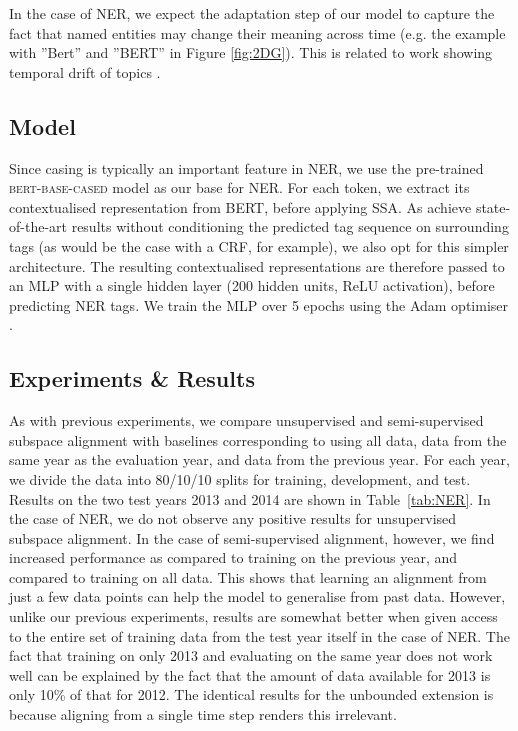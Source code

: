 \documentclass[letterpaper]{article} %
\begin{document}
In the case of NER, we expect the adaptation step of our model to capture the fact that named entities may change their meaning across time (e.g. the example with ''Bert'' and ''BERT'' in Figure \ref{fig:2DG}).
This is related to work showing temporal drift of topics \cite{wang2006topics}.

\subsection{Model}
Since casing is typically an important feature in NER, we use the pre-trained \textsc{bert-base-cased} model as our base for NER.
For each token, we extract its contextualised representation from BERT, before applying SSA.
As \citeauthor{bert} achieve state-of-the-art results without conditioning the predicted tag sequence on surrounding tags (as would be the case with a CRF, for example), we also opt for this simpler architecture.
The resulting contextualised representations are therefore passed to an MLP with a single hidden layer (200 hidden units, ReLU activation), before predicting NER tags.
We train the MLP over 5 epochs using the Adam optimiser \cite{adam}.


\subsection{Experiments \& Results}
As with previous experiments, we compare unsupervised and semi-supervised subspace alignment with baselines corresponding to using all data, data from the same year as the evaluation year, and data from the previous year.
For each year, we divide the data into 80/10/10 splits for training, development, and test.
Results on the two test years 2013 and 2014 are shown in Table~\ref{tab:NER}.
In the case of NER, we do not observe any positive results for unsupervised subspace alignment.
In the case of semi-supervised alignment, however, we find increased performance as compared to training on the previous year, and compared to training on all data.
This shows that learning an alignment from just a few data points can help the model to generalise from past data.
However, unlike our previous experiments, results are somewhat better when given access to the entire set of training data from the test year itself in the case of NER.
The fact that training on only 2013 and evaluating on the same year does not work well can be explained by the fact that the amount of data available for 2013 is only 10\% of that for 2012.
The identical results for the unbounded extension is because aligning from a single time step renders this irrelevant.
\end{document}
